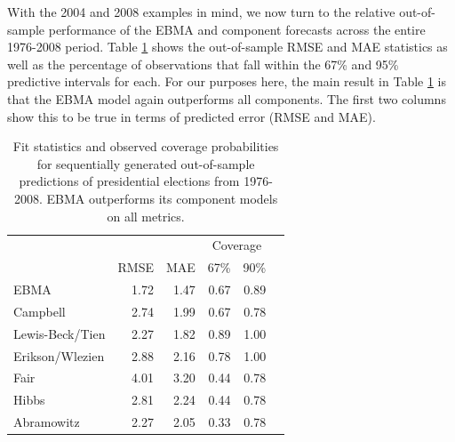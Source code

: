 With the 2004 and 2008 examples in mind, we now turn to the relative
out-of-sample performance of the EBMA and component forecasts across
the entire 1976-2008 period.  Table \ref{Pres-Res} shows the
out-of-sample RMSE and
MAE statistics as well as the percentage of observations that fall
within the 67\% and 95\% predictive intervals for each.  For our
purposes here, the main result in Table \ref{Pres-Res} is that the
EBMA model again outperforms all components.  The first two columns
show this to be true in terms of predicted error (RMSE and MAE).


\begin{table}[ht!]
  \caption{\footnotesize Fit statistics and observed coverage
    probabilities for sequentially generated out-of-sample predictions of
    presidential elections from 1976-2008.  EBMA outperforms its
    component models on all metrics.}
\label{Pres-Res} \small
\begin{center}
\begin{tabular}{lrrrrr}
\toprule
                        &              &              & \multicolumn{2}{c}{Coverage} \\ 
                    	&	RMSE&	MAE	&67\% &   90\%      \\
\midrule
EBMA	           &	1.72	&	1.47	&	0.67	&	0.89	\\
Campbell	           &	2.74	&	1.99	&	0.67	&	0.78	\\
Lewis-Beck/Tien&	2.27	&	1.82	&	0.89	&	1.00	\\
Erikson/Wlezien&	2.88	&	2.16	&	0.78	&	1.00	\\
Fair	                   &	4.01	&	3.20	&	0.44	&	0.78	\\
Hibbs	           &	2.81	&	2.24	&	0.44&      0.78 \\
Abramowitz	   &	2.27	&	2.05	&	0.33	&     0.78	\\

\bottomrule
\end{tabular}
\end{center}
\end{table}



